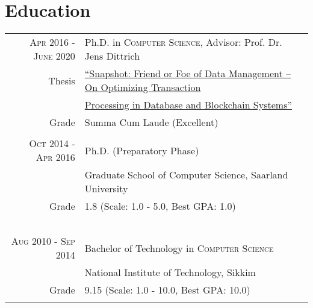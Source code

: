 \documentclass[a4paper,10pt]{article} %
\begin{document}
\section{Education}
\vspace*{0.2cm}
\begin{tabular}{rp{13cm}}	
	\textsc{Apr 2016 - June 2020} & Ph.D. in \textsc{Computer Science}, Advisor: Prof. Dr. Jens Dittrich\\
	Thesis& \href{https://publikationen.sulb.uni-saarland.de/handle/20.500.11880/29329}{``Snapshot: Friend or Foe of Data Management -- On Optimizing Transaction}\\
	&\href{https://publikationen.sulb.uni-saarland.de/handle/20.500.11880/29329}{Processing in Database and Blockchain Systems''}\\
	Grade&Summa Cum Laude (Excellent)\\
	&\\
	
	
	\textsc{Oct 2014 - Apr 2016} & Ph.D. (Preparatory Phase)\\
	& Graduate School of Computer Science, Saarland University\\
	Grade&1.8 (Scale: 1.0 - 5.0, Best GPA: 1.0)\\\
	&\\
	
	
	\textsc{Aug 2010 - Sep 2014} & Bachelor of Technology in \textsc{Computer Science}\\
	& National Institute of Technology, Sikkim\\
	Grade& 9.15 (Scale: 1.0 - 10.0, Best GPA: 10.0)\\
	&\\
	
\end{tabular}

\end{document}
